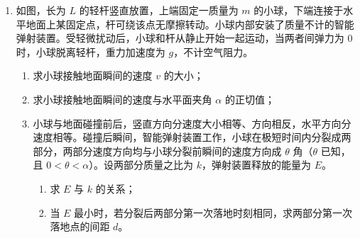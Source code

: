 \documentclass[\gkver]{gaokaozhenti}
\begin{document}
\begin{enumerate}
{联立可得 $v = \frac{E}{BL} - \frac{BLU_{0}}{mk}$

（3）从 $t_{0} \sim t_{1}$ 过程对导体棒，根据动量定理 $BIL \cdot t = mv_{0}$

又 $q' = \bar{I} \cdot t$

可得 $q' = \frac{mE}{B^{2}L^{2}}$

导体棒上产生的焦耳热 $Q_{1} = q'E - \frac{1}{2}mv_{0}^{2}$

可得 $Q_{1} = \frac{mE^{2}}{2B^{2}L^{2}}$

从 $t_{1}$ 时刻到导体棒静止过程中，根据能量守恒定律可知电路中产生的焦耳热为 $Q_{\text{总}} = \frac{1}{2}mv_{0}^{2}$

导体棒产生的焦耳热为 $Q_{2} = \frac{r}{R + r} \cdot Q_{\text{总}}$

可得 $Q_{2}=\frac{mrE^{2}}{2(R+r)B^{2}L^{2}}$

从 $t_{0}$ 时刻起到导体棒静止的过程中，导体棒上产生的焦耳热
$Q=Q_{1}+Q_{2}=\frac{(R+2r)mE^{2}}{2(R+r)B^{2}L^{2}}$
}
\item
如图，长为 $L$ 的轻杆竖直放置，上端固定一质量为 $m$ 的小球，下端连接于水平地面上某固定点，杆可绕该点无摩擦转动。小球内部安装了质量不计的智能弹射装置。受轻微扰动后，小球和杆从静止开始一起运动，当两者间弹力为 0 时，小球脱离轻杆，重力加速度为 $g$，不计空气阻力。
\begin{enumerate}
	\item
	求小球接触地面瞬间的速度 $v$ 的大小；
	\item
	求小球接触地面瞬间的速度与水平面夹角 $\alpha$ 的正切值；
	\item
	小球与地面碰撞前后，竖直方向分速度大小相等、方向相反，水平方向分速度相等。碰撞后瞬间，智能弹射装置工作，小球在极短时间内分裂成两部分，两部分速度方向均与小球分裂前瞬间的速度方向成 $\theta$ 角（$\theta$ 已知，且 $0 < \theta < \alpha$）。设两部分质量之比为 $k$，弹射装置释放的能量为 $E$。
	\begin{enumerate}[label=(\roman*)]
		\item
		求 $E$ 与 $k$ 的关系；
		\item
		当 $E$ 最小时，若分裂后两部分第一次落地时刻相同，求两部分第一次落地点的间距 $d$。
	\end{enumerate}
\end{enumerate}
\onepicture[w=6.5cm, align=right]{}
\end{enumerate}
\end{document}
